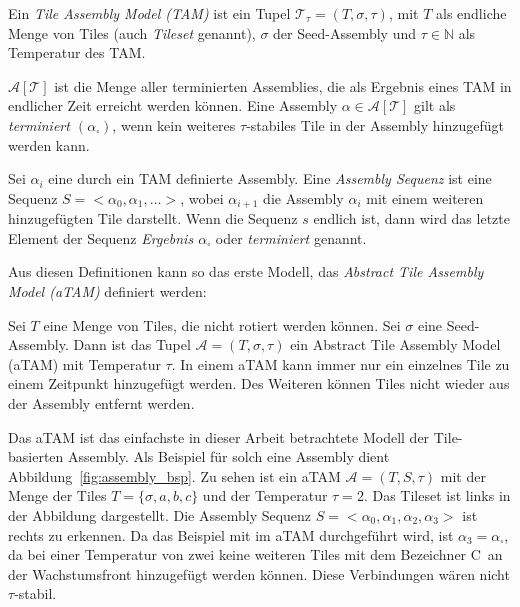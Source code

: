 \begin{definition}
	Ein \emph{Tile Assembly Model (TAM)} ist ein Tupel $\mathcal{T}_\tau = (T,\sigma,\tau)$, mit $T$ als endliche Menge von Tiles (auch \emph{Tileset} genannt), $\sigma$ der Seed-Assembly und $\tau\in\mathbb{N}$ als Temperatur des TAM. 
\end{definition}

\begin{definition}
	$\mathcal{A}[\mathcal{T}]$ ist die Menge aller terminierten Assemblies, die als Ergebnis eines TAM in endlicher Zeit erreicht werden können. 
	Eine Assembly $\alpha\in\mathcal{A}[\mathcal{T}]$ gilt als \emph{terminiert $(\alpha_{\square})$}, wenn kein weiteres $\tau$-stabiles Tile in der Assembly hinzugefügt werden kann.
\end{definition}

\begin{definition}
	Sei $\alpha_i$ eine durch ein TAM definierte Assembly. Eine \emph{Assembly Sequenz} ist eine Sequenz $S=<\alpha_0,\alpha_1,\dots>$, wobei $\alpha_{i+1}$ die Assembly $\alpha_i$ mit einem weiteren hinzugefügten Tile darstellt. 
	Wenn die Sequenz $s$ endlich ist, dann wird das letzte Element der Sequenz \emph{Ergebnis $\alpha_\square$} oder \emph{terminiert} genannt.
\end{definition}

Aus diesen Definitionen kann so das erste Modell, das \emph{Abstract Tile Assembly Model (aTAM)} definiert werden:

\begin{definition}
	Sei $T$ eine Menge von Tiles, die nicht rotiert werden können. Sei $\sigma$ eine Seed-Assembly. Dann ist das Tupel $\mathcal{A} =(T,\sigma,\tau)$ ein Abstract Tile Assembly Model (aTAM) mit Temperatur $\tau$\!. In einem aTAM kann immer nur ein einzelnes Tile zu einem Zeitpunkt hinzugefügt werden. Des Weiteren können Tiles nicht wieder aus der Assembly entfernt werden.
\end{definition}

Das aTAM ist das einfachste in dieser Arbeit betrachtete Modell der Tile-basierten Assembly. 
Als Beispiel für solch eine Assembly dient Abbildung~\ref{fig:assembly_bsp}. 
Zu sehen ist ein aTAM $\mathcal{A} = (T,S,\tau)$ mit der Menge der Tiles $T=\{ \sigma,a,b,c\}$ und der Temperatur $\tau = 2$. 
Das Tileset ist links in der Abbildung dargestellt. Die Assembly Sequenz $S = <\alpha_0,\alpha_1,\alpha_2,\alpha_3>$ ist rechts zu erkennen. Da das Beispiel mit im aTAM durchgeführt wird, ist $\alpha_3=\alpha_\square$, da bei einer Temperatur von zwei keine weiteren Tiles mit dem Bezeichner \glqq C\grqq\, an der Wachstumsfront hinzugefügt werden können. Diese Verbindungen wären nicht $\tau$-stabil.

